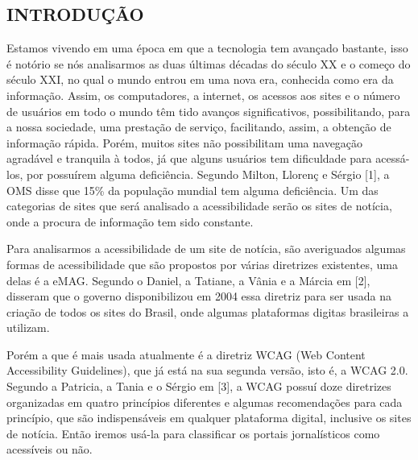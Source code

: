 \documentclass[a4paper]{article}
\begin{document}
\begin{titlepage}
	\begin{center}
		\tableofcontents
	\end{center}
\end{titlepage}
\begin{titlepage}
\section{INTRODUÇÃO}
\fontsize{12pt}{0pt}\selectfont
Estamos vivendo em uma época em que a tecnologia tem avançado bastante, isso é notório se nós analisarmos as duas últimas décadas do século XX e o começo do século XXI, no qual o mundo entrou em uma nova era, conhecida como era da informação. Assim, os computadores, a internet, os acessos aos sites e o número de usuários em todo o mundo têm tido avanços significativos, possibilitando, para a nossa sociedade, uma prestação de serviço, facilitando, assim, a obtenção de informação rápida. Porém, muitos sites não possibilitam uma navegação agradável e tranquila à todos, já que alguns usuários tem dificuldade para acessá-los, por possuírem alguma deficiência. Segundo Milton, Llorenç e Sérgio [1], a OMS disse que 15\% da população mundial tem alguma deficiência. Um das categorias de sites que será analisado a acessibilidade serão os sites de notícia, onde a procura de informação tem sido constante.

Para analisarmos a acessibilidade de um site de notícia, são averiguados algumas formas de acessibilidade que são propostos por várias diretrizes existentes, uma delas é a eMAG. Segundo o Daniel, a Tatiane, a Vânia e a Márcia em [2], disseram que o governo disponibilizou em 2004 essa diretriz para ser usada na criação de todos os sites do Brasil, onde algumas plataformas digitas brasileiras a utilizam.

Porém a que é mais usada atualmente é a diretriz WCAG (Web Content Accessibility Guidelines), que já está na sua segunda versão, isto é, a WCAG 2.0. Segundo a Patricia, a Tania e o Sérgio em [3], a WCAG possuí doze diretrizes organizadas em quatro princípios diferentes e algumas recomendações para cada princípio, que são indispensáveis em qualquer plataforma digital, inclusive os sites de notícia. Então iremos usá-la para classificar os portais jornalísticos como acessíveis ou não.


\end{titlepage}
\end{document}
